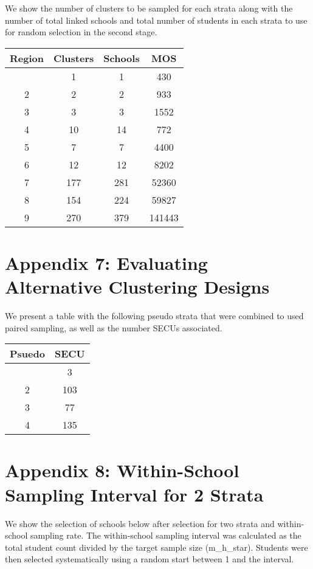 \documentclass[
  12pt]{article}
\begin{document}
We show the number of clusters to be sampled for each strata along with
the number of total linked schools and total number of students in each
strata to use for random selection in the second stage.

\begin{longtable}[]{@{}cccc@{}}
\toprule\noalign{}
Region & Clusters & Schools & MOS \\
\midrule\noalign{}
\endhead
\bottomrule\noalign{}
\endlastfoot
1 & 1 & 1 & 430 \\
2 & 2 & 2 & 933 \\
3 & 3 & 3 & 1552 \\
4 & 10 & 14 & 772 \\
5 & 7 & 7 & 4400 \\
6 & 12 & 12 & 8202 \\
7 & 177 & 281 & 52360 \\
8 & 154 & 224 & 59827 \\
9 & 270 & 379 & 141443 \\
\end{longtable}

\newpage

\section{Appendix 7: Evaluating Alternative Clustering
Designs}\label{appendix-7-evaluating-alternative-clustering-designs}

We present a table with the following pseudo strata that were combined
to used paired sampling, as well as the number SECUs associated.

\begin{longtable}[]{@{}cc@{}}
\toprule\noalign{}
Psuedo & SECU \\
\midrule\noalign{}
\endhead
\bottomrule\noalign{}
\endlastfoot
1 & 3 \\
2 & 103 \\
3 & 77 \\
4 & 135 \\
\end{longtable}

\newpage

\section{Appendix 8: Within-School Sampling Interval for 2
Strata}\label{appendix-8-within-school-sampling-interval-for-2-strata}

We show the selection of schools below after selection for two strata
and within-school sampling rate. The within-school sampling interval was
calculated as the total student count divided by the target sample size
(m\_h\_star). Students were then selected systematically using a random
start between 1 and the interval.
\end{document}
